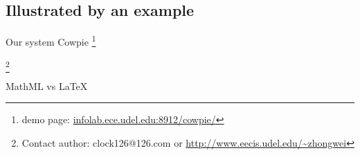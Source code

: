 \subsection{Illustrated by an example}
\label{secIllu}

Our system Cowpie \footnote{demo page: \url{infolab.ece.udel.edu:8912/cowpie/}}

\let\thefootnote\relax\footnote{Contact author: clock126@126.com or
\url{http://www.eecis.udel.edu/~zhongwei}}

MathML vs LaTeX
